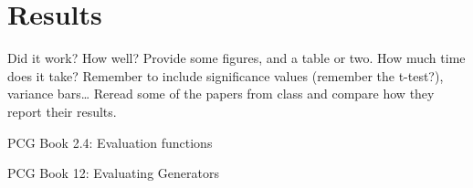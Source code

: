 \section{Results}
\label{05}

Did it work? How well? Provide some figures, and a table or two. How much time does it take? Remember to include significance values (remember the t-test?), variance bars… Reread some of the papers from class and compare how they report their results.

PCG Book 2.4: Evaluation functions

PCG Book 12: Evaluating Generators

